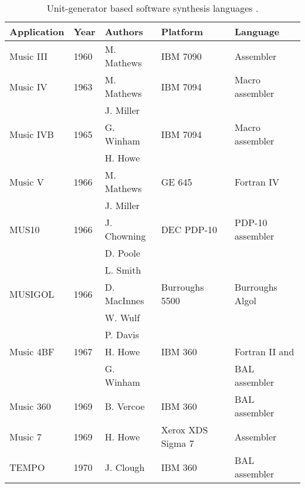 \chapter{}


\begin{table}[htbp]
	\caption{Unit­-generator ­based software synthesis languages \cite[789-790]{Roads1995}.}
	\centering
	\vspace{12pt}
	\begin{tabular}{ *{5}{l} }
		\hline
		Application & Year & Authors & Platform & Language \\
		\hline
		Music III & 1960 & M. Mathews & IBM 7090 & Assembler \\
		Music IV & 1963 & M. Mathews & IBM 7094 & Macro assembler \\
		& & J. Miller & & \\
		Music IVB & 1965 & G. Winham & IBM 7094 & Macro assembler \\
		& & H. Howe & & \\
		Music V & 1966 & M. Mathews & GE 645 & Fortran IV \\
		& & J. Miller & & \\
		MUS10 & 1966 & J. Chowning & DEC PDP­-10 & PDP­-10 assembler \\
		& & D. Poole & & \\
		& & L. Smith & & \\
		MUSIGOL & 1966 & D. MacInnes & Burroughs 5500 & Burroughs Algol \\
		& & W. Wulf & & \\
		& & P. Davis & & \\
		Music 4BF & 1967 & H. Howe & IBM 360 & Fortran II and \\
		& & G. Winham & & BAL assembler \\
		Music 360 & 1969 & B. Vercoe & IBM 360 & BAL assembler \\
		Music 7 & 1969 & H. Howe & Xerox XDS Sigma 7 & Assembler \\
		TEMPO & 1970 & J. Clough & IBM 360 & BAL assembler \\

\end{tabular}
\end{table}
